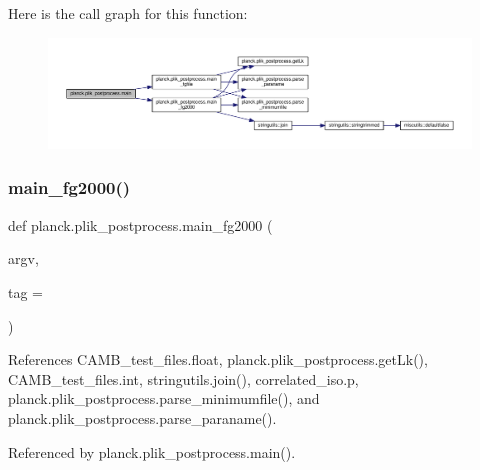 Here is the call graph for this function\+:
\nopagebreak
\begin{figure}[H]
\begin{center}
\leavevmode
\includegraphics[width=350pt]{namespaceplanck_1_1plik__postprocess_a9ebb24e486ebd883116b6b49356dea52_cgraph}
\end{center}
\end{figure}
\mbox{\label{namespaceplanck_1_1plik__postprocess_a81625cf708d7a89aad8e0aba301d99b6}} 
\subsubsection{\texorpdfstring{main\+\_\+fg2000()}{main\_fg2000()}}
{\footnotesize\ttfamily def planck.\+plik\+\_\+postprocess.\+main\+\_\+fg2000 (\begin{DoxyParamCaption}\item[{}]{argv,  }\item[{}]{tag = {\ttfamily \textquotesingle{}\textquotesingle{}} }\end{DoxyParamCaption})}



References C\+A\+M\+B\+\_\+test\+\_\+files.\+float, planck.\+plik\+\_\+postprocess.\+get\+Lk(), C\+A\+M\+B\+\_\+test\+\_\+files.\+int, stringutils.\+join(), correlated\+\_\+iso.\+p, planck.\+plik\+\_\+postprocess.\+parse\+\_\+minimumfile(), and planck.\+plik\+\_\+postprocess.\+parse\+\_\+paraname().



Referenced by planck.\+plik\+\_\+postprocess.\+main().

